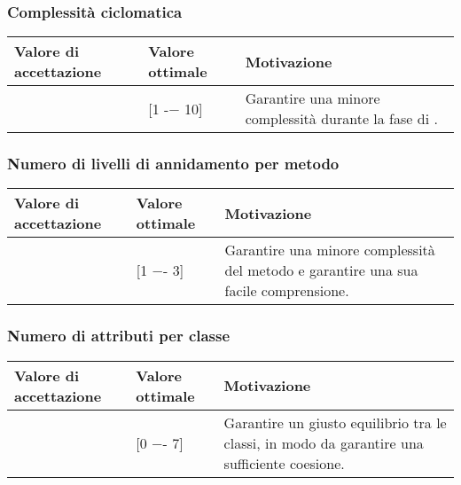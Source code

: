 \subsubsection{Complessità ciclomatica}

\begin{center}
		\begin{tabular}{|P{2.5cm}|P{2.5cm}|P{6cm}|}
		\hline
			\textbf{Valore di accettazione}	& \textbf{Valore ottimale} & \textbf{Motivazione} \\
			\hline
			[1 -− 15] & [1 -− 10] &	Garantire una minore complessità durante la fase di \COD. \\
			\hline
			\end{tabular}
\end{center}

\subsubsection{Numero di livelli di annidamento per metodo}

\begin{center}
		\begin{tabular}{|P{2.5cm}|P{2.5cm}|P{6cm}|}
		\hline
			\textbf{Valore di accettazione}	& \textbf{Valore ottimale} & \textbf{Motivazione} \\
			\hline
			[1 -- 5] & [1 −- 3] &	Garantire una minore complessità del metodo e garantire una sua facile comprensione. \\
			\hline
			\end{tabular}
\end{center}

\subsubsection{Numero di attributi per classe}

\begin{center}
		\begin{tabular}{|P{2.5cm}|P{2.5cm}|P{6cm}|}
		\hline
			\textbf{Valore di accettazione}	& \textbf{Valore ottimale} & \textbf{Motivazione} \\
			\hline
			[0 −- 11] & [0 −- 7] &	Garantire un giusto equilibrio tra le classi, in modo da garantire una sufficiente coesione. \\
			\hline
			\end{tabular}
\end{center}

